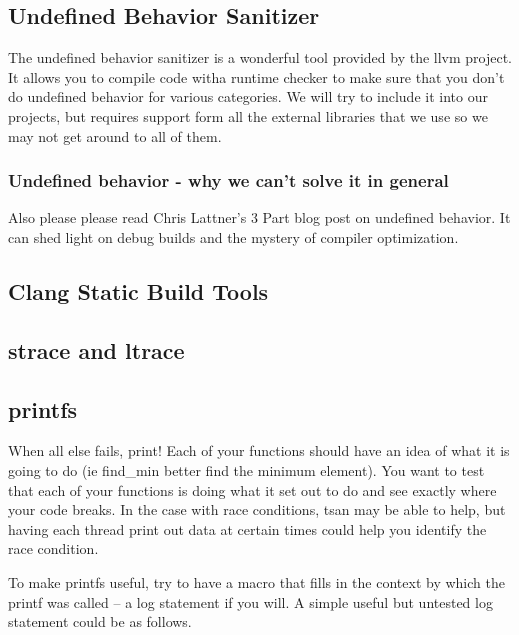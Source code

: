 \subsection{Undefined Behavior Sanitizer}

The undefined behavior sanitizer is a wonderful tool provided by the llvm project. It allows you to compile code witha  runtime checker to make sure that you don't do undefined behavior for various categories. We will try to include it into our projects, but requires support form all the external libraries that we use so we may not get around to all of them.

\subsubsection{Undefined behavior - why we can't solve it in general}

Also please please read Chris Lattner's 3 Part blog post on undefined behavior. It can shed light on debug builds and the mystery of compiler optimization.



\subsection{Clang Static Build Tools}

\subsection{strace and ltrace}

\subsection{printfs}

When all else fails, print! Each of your functions should have an idea of what it is going to do (ie find\_min better find the minimum element).
You want to test that each of your functions is doing what it set out to do and see exactly where your code breaks.
In the case with race conditions, tsan may be able to help, but having each thread print out data at certain times could help you identify the race condition.

To make printfs useful, try to have a macro that fills in the context by which the printf was called -- a log statement if you will. A simple useful but untested log statement could be as follows.

